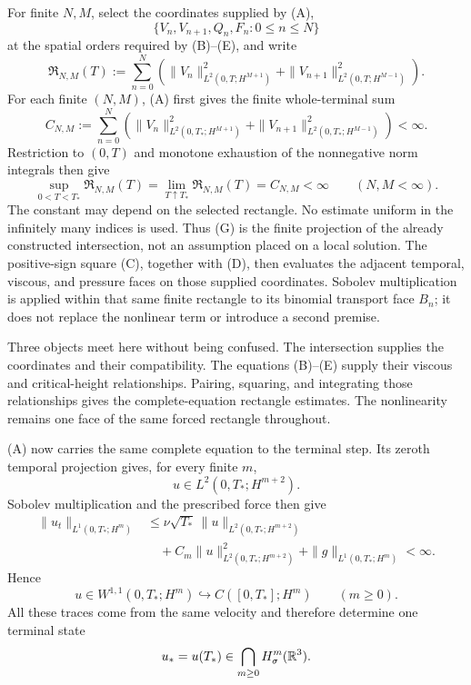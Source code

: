 \label{guide:mixed-jet-map}
For finite \(N,M\), select the coordinates supplied by (A),
\[
 \{V_n,V_{n+1},Q_n,F_n:0\le n\le N\}
\]
at the spatial orders required by (B)--(E), and write
\[
 \mathfrak R_{N,M}(T)
 :=\sum_{n=0}^{N}\left(
 \|V_n\|_{L^2(0,T;H^{M+1})}^2
 +\|V_{n+1}\|_{L^2(0,T;H^{M-1})}^2\right).
 \tag{F}
\]
For each finite \((N,M)\), (A) first gives the finite whole-terminal sum
\[
 C_{N,M}:=\sum_{n=0}^{N}\left(
 \|V_n\|_{L^2(0,T_*;H^{M+1})}^2
 +\|V_{n+1}\|_{L^2(0,T_*;H^{M-1})}^2\right)<\infty.
\]
Restriction to \((0,T)\) and monotone exhaustion of the nonnegative norm
integrals then give
\[
 \sup_{0<T<T_*}\mathfrak R_{N,M}(T)
 =\lim_{T\uparrow T_*}\mathfrak R_{N,M}(T)
 =C_{N,M}<\infty
 \qquad(N,M<\infty).
 \tag{G}
\]
The constant may depend on the selected rectangle.  No estimate uniform in
the infinitely many indices is used.  Thus (G) is the finite projection of
the already constructed intersection, not an assumption placed on a local
solution.  The positive-sign square (C), together with (D), then evaluates
the adjacent temporal, viscous, and pressure faces on those supplied
coordinates.  Sobolev multiplication is applied within that same finite
rectangle to its binomial transport face \(B_n\); it does not replace the
nonlinear term or introduce a second premise.

Three objects meet here without being confused.  The intersection supplies
the coordinates and their compatibility.  The equations (B)--(E) supply their
viscous and critical-height relationships.  Pairing, squaring, and integrating
those relationships gives the complete-equation rectangle estimates.  The
nonlinearity remains one face of the same forced rectangle throughout.

\label{guide:finite-estimates}
(A) now carries the same complete equation to the terminal step.  Its
zeroth temporal projection gives, for every finite \(m\),
\[
 u\in L^2(0,T_*;H^{m+2}).
\]
Sobolev multiplication and the prescribed force then give
\begin{align*}
 \|u_t\|_{L^1(0,T_*;H^m)}
 &\le \nu\sqrt{T_*}\,\|u\|_{L^2(0,T_*;H^{m+2})}\\
 &\quad+C_m\|u\|_{L^2(0,T_*;H^{m+2})}^2
 +\|g\|_{L^1(0,T_*;H^m)}<\infty.
\end{align*}
Hence
\[
 u\in W^{1,1}(0,T_*;H^m)
 \hookrightarrow C([0,T_*];H^m)
 \qquad(m\ge0).
\]
All these traces come from the same velocity and therefore determine one
terminal state
\[
 u_*=u(T_*)\in\bigcap_{m\ge0}H^m_\sigma(\mathbb R^3).
\]

